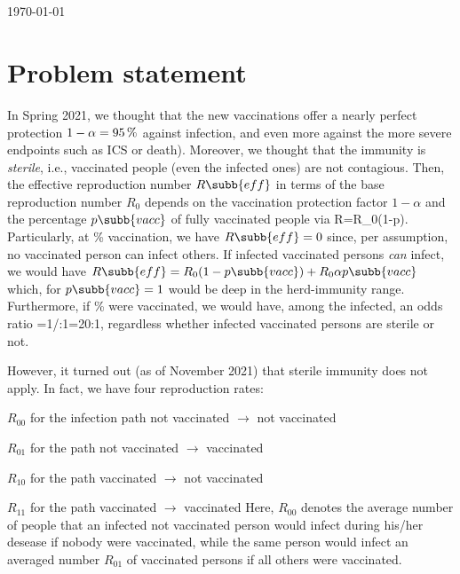 \documentclass[12pt,a4paper]{scrartcl}
\begin{document}
\begin{center}
\\[5mm]
\\
\today
\end{center}


\section{Problem statement}

In Spring 2021, we thought that the new vaccinations offer a nearly
perfect protection $1-\alpha=\unit[95]{\%}$ against infection, and even
more against the more severe endpoints such as ICS or death). Moreover,
we thought that the immunity is \emph{sterile}, i.e., vaccinated people
(even the infected ones)  are not
contagious. Then, the effective reproduction number $R\subb{eff}$ in
terms of the  base reproduction number $R_0$ depends on the
vaccination protection
factor $1-\alpha$  and the percentage $p\subb{vacc}$ of fully vaccinated people via
%
\bdm
R=R_0(1-p).
\edm
%
Particularly, at \unit[100]{\%} vaccination, we have
$R\subb{eff}=0$ since, per assumption, no vaccinated person can infect
others. If infected vaccinated persons \emph{can} infect, we would
have $R\subb{eff}=R_0(1-p\subb{vacc})+R_0\alpha p\subb{vacc}$ which,
for $p\subb{vacc}=1$ would be deep in the herd-immunity
range. Furthermore, if
\unit[50]{\%} were vaccinated, we would have, among the infected, an
odds ratio 
\bdm
{} =1/\alpha:1=20:1, 
\edm
regardless whether infected vaccinated persons are sterile or not.

However, it turned out (as of November 2021) that sterile immunity
does not apply. In fact, we have four reproduction rates:
\bi
\item $R_{00}$ for the infection path not vaccinated $\to$ not vaccinated
\item $R_{01}$ for the path not vaccinated $\to$ vaccinated
\item $R_{10}$ for the path vaccinated $\to$ not vaccinated
\item $R_{11}$ for the path vaccinated $\to$ vaccinated
\ei
Here, $R_{00}$ denotes the average number of people that an infected
not vaccinated person would infect during his/her desease if nobody were
vaccinated, while the same person would infect an averaged number
$R_{01}$ of vaccinated persons if all others were vaccinated. 
\end{document}
